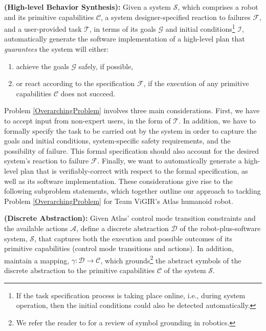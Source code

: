 
\begin{myProblem}\label{OverarchingProblem}
\textbf{(High-level Behavior Synthesis):}
	Given a system $\mathcal{S}$, which comprises a robot and its primitive capabilities $\mathcal{C}$, a system designer-specified reaction to failures $\mathcal{F}$, and a user-provided task $\mathcal{T}$, in terms of its goals $\mathcal{G}$ and initial conditions\footnote{If the task specification process is taking place online, i.e., during system operation, then the initial conditions could also be detected automatically.}
	 $\mathcal{I}$, automatically generate the software implementation of a high-level plan that \emph{guarantees} the system will either:
	\begin{enumerate}[i]
		\item achieve the goals $\mathcal{G}$ safely, if possible,
		\item or react according to the specification $\mathcal{F}$, if the execution of any primitive capabilities $\mathcal{C}$ does not succeed.
	\end{enumerate}
\end{myProblem}

Problem \ref{OverarchingProblem} involves three main considerations.
First, we have to accept input from non-expert users, in the form of $\mathcal{T}$.
In addition, we have to formally specify the task to be carried out by the system in order to capture the goals and initial conditions, system-specific safety requirements, and the possibility of failure.
This formal specification should also account for the desired system's reaction to failure $\mathcal{F}$.
Finally, we want to automatically generate a high-level plan that is verifiably-correct with respect to the formal specification, as well as its software implementation.
These considerations give rise to the following subproblem statements, which together outline our approach to tackling Problem \ref{OverarchingProblem} for Team ViGIR's Atlas humanoid robot.

\begin{myProblem}\label{DiscreteAbstractionProblem}
\textbf{(Discrete Abstraction):}
Given Atlas' control mode transition constraints and the available actions $\mathcal{A}$, define a discrete abstraction $\mathcal{D}$ of the robot-plus-software system, $\mathcal{S}$, that captures both the execution and possible outcomes of its primitive capabilities (control mode transitions and actions).
In addition, maintain a mapping, $\gamma: \mathcal{D} \rightarrow \mathcal{C}$, which grounds\footnote{We refer the reader to \cite{Grounding2013} for a review of symbol grounding in robotics.}
 the abstract symbols of the discrete abstraction to the primitive capabilities $\mathcal{C}$ of the system $\mathcal{S}$.
\end{myProblem}

